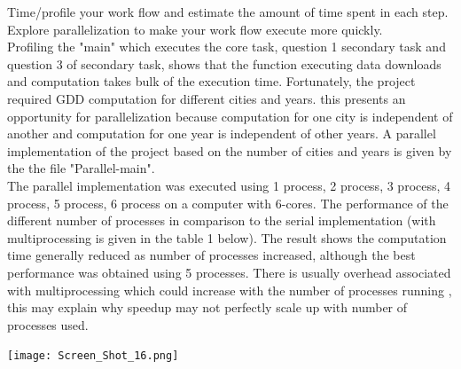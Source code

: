Time/profile your work flow and estimate the amount of time spent in each step. Explore parallelization to make your work flow execute more quickly.\\

Profiling the "main" which executes the core task, question 1 secondary task and question 3 of secondary task, shows that the function executing data downloads and computation takes bulk of the execution time. Fortunately, the project required GDD computation for different cities and years. this presents an opportunity for parallelization because computation for one city is independent of another and computation for one year is independent of other years. A parallel implementation of the project based on the number of cities and years is given by the the file "Parallel-main".\\
 The parallel implementation was executed using 1 process, 2 process, 3 process, 4 process, 5 process, 6 process on a computer with 6-cores. The performance of the different number of processes in comparison to the serial implementation (with multiprocessing is given in the table 1 below). The result shows the computation time generally reduced as number of processes increased, although the best performance was obtained using 5 processes. There is usually overhead associated with multiprocessing which could increase with the number of processes running , this may explain why speedup may not perfectly scale up with number of processes used.  

\texttt{[image: Screen\_Shot\_16.png]}\\





